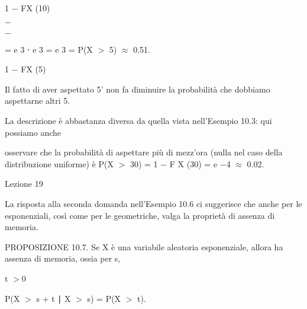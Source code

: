 \documentclass[a4paper,portrait,12pt]{article}
\begin{document}
\begin{flushleft}
1 $-$ FX (10)
\end{flushleft}


$-$


$-$


\begin{flushleft}
= e 3 ⋅ e 3 = e 3 = P(X $>$ 5) $\approx$ 0.51.
\end{flushleft}


\begin{flushleft}
1 $-$ FX (5)
\end{flushleft}





\begin{flushleft}
Il fatto di aver aspettato 5' non fa diminuire la probabilit\`{a} che dobbiamo aspettarne altri 5.
\end{flushleft}


\begin{flushleft}
La descrizione \`{e} abbastanza diversa da quella vista nell'Esempio 10.3: qui possiamo anche
\end{flushleft}


\begin{flushleft}
osservare che la probabilit\`{a} di aspettare più di mezz'ora (nulla nel caso della distribuzione uniforme) \`{e} P(X $>$ 30) = 1 $-$ F X (30) = e $-$4 $\approx$ 0.02.
\end{flushleft}


\begin{flushleft}
Lezione 19
\end{flushleft}





\begin{flushleft}
La risposta alla seconda domanda nell'Esempio 10.6 ci suggerisce che anche per le esponenziali, così come per le geometriche, valga la propriet\`{a} di assenza di memoria.
\end{flushleft}


\begin{flushleft}
PROPOSIZIONE 10.7. Se X \`{e} una variabile aleatoria esponenziale, allora ha assenza di memoria, ossia per s,
\end{flushleft}


\begin{flushleft}
t $>$0
\end{flushleft}


\begin{flushleft}
P(X $>$ s + t ∣ X $>$ s) = P(X $>$ t).
\end{flushleft}
\end{document}

